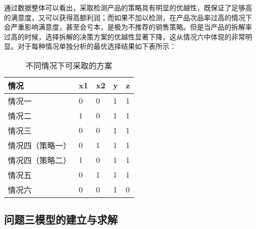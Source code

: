 \documentclass[utf8]{ctexart} %
\begin{document}
		
		
		
		通过数据整体可以看出，采取检测产品的策略具有明显的优越性，既保证了足够高的满意度，又可以获得高额利润；而如果不加以检测，在产品次品率过高的情况下会严重影响满意度，甚至会亏本，是极为不推荐的销售策略。但是当产品的拆解率过高的时候，选择拆解的决策方案的优越性显著下降，这从情况六中体现的非常明显。对于每种情况单独分析的最优选择结果如下表所示：
	\begin{table}[H]  
		\centering  
		\caption{不同情况下可采取的方案}  
		\label{tab:scenarios}  
		\begin{tabular}{p{}p{}p{}p{}p{}}  
			\toprule  
			\textbf{情况} & \textbf{x1} & \textbf{x2} & \textbf{y} & \textbf{z} \\  
			\midrule  
			情况一 & 0 & 0 & 1 & 1 \\  
			情况二 & 1 & 0 & 1 & 1 \\  
			情况三 & 0 & 0 & 1 & 1 \\  
			情况四（策略一） & 0 & 1 & 1 & 1 \\  
			情况四（策略二） & 1 & 0 & 1 & 1 \\  
			情况五 & 0 & 1 & 1 & 1 \\  
			情况六 & 0 & 0 & 1 & 0 \\  
			\bottomrule  
		\end{tabular}  
	\end{table}  
		\subsection{问题三模型的建立与求解}
\end{document}
